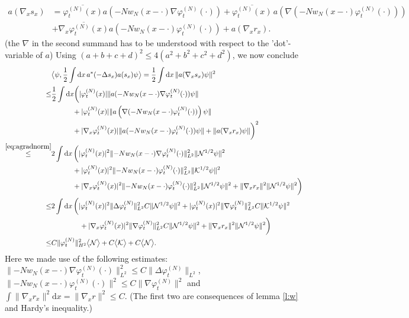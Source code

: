 \documentclass[11pt,a4paper]{scrartcl}
\newcommand{\di}{\textrm{d}}		%
\newcommand{\Ncal}{\mathcal{N}}		%
\newcommand{\Kcal}{\mathcal{K}}		%
\newcommand{\scal}[2]{\big<#1,#2\big>} %
\newcommand{\cc}[1]{\overline{#1}}	%
\newcommand{\norm}[1]{\lVert#1\rVert}	%
\newcommand{\ev}[1]{\big<#1\big>}	%
\newcommand{\ph}{\varphi_t^{(N)}}	%
\newcommand{\eqr}[1]{\eqref{eq:#1}}			%
\begin{document}
\begin{align*}
 a(\nabla_x s_x) & = \cc{\ph(x)} a(-Nw_N(x-\cdot)\nabla\ph(\cdot)) + \cc{\ph(x)}\,a\left(\nabla(-N w_N(x-\cdot)\ph(\cdot))\right) \\
 & + \cc{\nabla_x \ph(x)} a(-Nw_N(x-\cdot)\ph(\cdot)) + a(\nabla_x r_x).
\end{align*}
(the $\nabla$ in the second summand has to be understood with respect to the 'dot'-variable of $a$)
Using $(a+b+c+d)^2 \leq 4(a^2+b^2+c^2+d^2)$, we now conclude
\begin{equation}
\label{eq:bound2B}
\begin{split}
 & \scal{\psi}{\frac{1}{2}\int \di x\, a^\ast(-\Delta s_x) a(s_x)\psi} = \frac{1}{2}\int \di x\, \norm{a(\nabla_x s_x)\psi}^2 \\
\leq & \frac{1}{2} \int \di x \bigg( \lvert \ph(x)\rvert \norm{a(-Nw_N(x-\cdot)\nabla\ph(\cdot))\psi} \\
& \qquad\quad + \lvert \ph(x)\rvert \norm{a\left(\nabla(-N w_N(x-\cdot)\ph(\cdot))\right)\psi} \\
& \qquad\quad + \lvert \nabla_x \ph(x)\rvert \norm{a(-Nw_N(x-\cdot)\ph(\cdot))\psi} + \norm{a(\nabla_x r_x)\psi}  \bigg)^2 \\
\stackrel{\eqr{agradnorm}}{\leq} & 2\int \di x\, \bigg( \lvert \ph(x)\rvert^2 \norm{-N w_N(x-\cdot)\nabla\ph(\cdot)}_{L^2}^2 \norm{\Ncal^{1/2}\psi}^2  \\
& \qquad\quad+ \lvert \ph(x)\rvert^2 \norm{-Nw_N(x-\cdot) \ph(\cdot)}_{L^2}^2 \norm{\Kcal^{1/2}\psi}^2  \\
& \qquad\quad + \lvert \nabla_x \ph(x)\rvert^2 \norm{-N w_N(x-\cdot) \ph(\cdot)}_{L^2}^2 \norm{\Ncal^{1/2}\psi}^2 + \norm{\nabla_x r_x}^2 \norm{\Ncal^{1/2}\psi}^2 \bigg) \\
\leq & 2 \int \di x\, \bigg( \lvert \ph(x)\rvert^2 \norm{\Delta \ph}_{L^2}^2 C \norm{\Ncal^{1/2}\psi}^2 + \lvert \ph(x)\rvert^2 \norm{\nabla \ph}_{L^2}^2 C \norm{\Kcal^{1/2}\psi}^2 \\
& \qquad\qquad + \lvert \nabla_x \ph(x)\rvert^2 \norm{\nabla \ph}_{L^2}^2 C \norm{\Ncal^{1/2}\psi}^2 + \norm{\nabla_x r_x}^2 \norm{\Ncal^{1/2}\psi}^2 \bigg)\\
\leq & C \norm{\ph}_{H^2}^2 \ev{\Ncal} + C\ev{\Kcal} + C\ev{\Ncal}.
\end{split} 
\end{equation}
Here we made use of the following estimates: $\norm{-N w_N(x-\cdot) \nabla\ph(\cdot)}_{L^2}^2 \leq C\norm{\Delta \ph}_{L^2}$, $\norm{-N w_N(x-\cdot)\ph(\cdot)}^2 \leq C \norm{\nabla \ph}^2$  and $\int \norm{\nabla_x r_x}^2 \di x= \norm{\nabla_x r}^2 \leq C$. (The first two are consequences of lemma \ref{l:w} and Hardy's inequality.)
\end{document}
